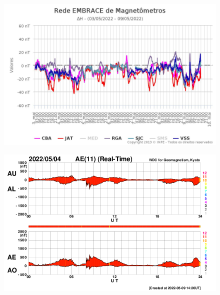 \documentclass[11pt, oneside]{article}
\begin{document}
                     \begin{figure}[H]
    
                        \centering
   
                             \includegraphics[width=14cm]{./figures//figureGeomag_1.png}

                        \end{figure}

                     \begin{figure}[H]
    
                        \centering
   
                             \includegraphics[width=14cm]{./figures//figureGeomag_2.png}

                        \end{figure}
\end{document}
